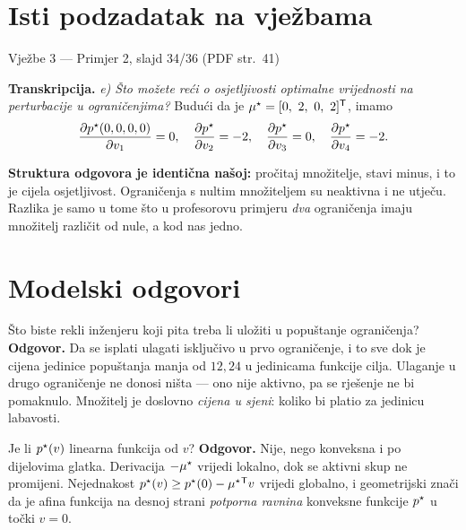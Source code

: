 \section{Isti podzadatak na vježbama}
\label{sec:z1f-vjezbe}

\begin{izvor}{Vježbe 3 --- Primjer 2, slajd 34/36 (PDF str.~41)}

\textbf{Transkripcija.} \emph{e) Što možete reći o osjetljivosti optimalne
vrijednosti na perturbacije u ograničenjima?} Budući da je
$\mu^{\star} = [0,\ 2,\ 0,\ 2]^{\mathsf{T}}$, imamo
\[
\frac{\partial p^{\star}(0,0,0,0)}{\partial v_1} = 0,\quad
\frac{\partial p^{\star}}{\partial v_2} = -2,\quad
\frac{\partial p^{\star}}{\partial v_3} = 0,\quad
\frac{\partial p^{\star}}{\partial v_4} = -2 .
\]

\textbf{Struktura odgovora je identična našoj:} pročitaj množitelje, stavi minus,
i to je cijela osjetljivost. Ograničenja s nultim množiteljem su neaktivna i ne
utječu. Razlika je samo u tome što u profesorovu primjeru \emph{dva} ograničenja
imaju množitelj različit od nule, a kod nas jedno.
\end{izvor}

\section{Modelski odgovori}
\label{sec:z1f-odgovori}

\begin{pitanje}{Što biste rekli inženjeru koji pita treba li uložiti u popuštanje ograničenja?}
\textbf{Odgovor.} Da se isplati ulagati isključivo u prvo ograničenje, i to sve
dok je cijena jedinice popuštanja manja od $12{,}24$ u jedinicama funkcije cilja.
Ulaganje u drugo ograničenje ne donosi ništa --- ono nije aktivno, pa se rješenje
ne bi pomaknulo. Množitelj je doslovno \emph{cijena u sjeni}: koliko bi platio za
jedinicu labavosti.
\end{pitanje}

\begin{pitanje}{Je li $p^{\star}(v)$ linearna funkcija od $v$?}
\textbf{Odgovor.} Nije, nego konveksna i po dijelovima glatka. Derivacija
$-\mu^{\star}$ vrijedi lokalno, dok se aktivni skup ne promijeni. Nejednakost
$p^{\star}(v) \geq p^{\star}(0) - \mu^{\star}{}^{\mathsf{T}} v$ vrijedi globalno, i geometrijski
znači da je afina funkcija na desnoj strani \emph{potporna ravnina} konveksne
funkcije $p^{\star}$ u točki $v = 0$.
\end{pitanje}

